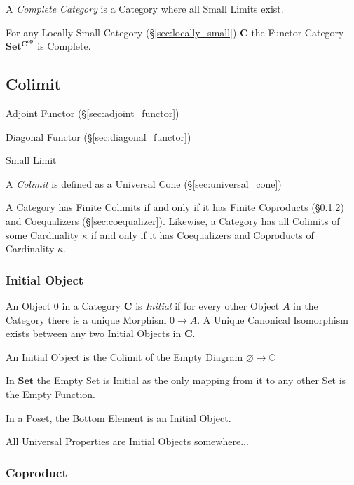 A \emph{Complete Category} is a Category where all Small Limits exist.

For any Locally Small Category (\S\ref{sec:locally_small})
$\mathbf{C}$ the Functor Category $\mathbf{Set^{C^{op}}}$ is Complete.



\subsection{Colimit} \label{sec:colimit}

Adjoint Functor (\S\ref{sec:adjoint_functor})

Diagonal Functor (\S\ref{sec:diagonal_functor})

Small Limit

A \emph{Colimit} is defined as a Universal Cone
(\S\ref{sec:universal_cone})

A Category has Finite Colimits if and only if it has Finite Coproducts
(\S\ref{sec:coproduct}) and Coequalizers (\S\ref{sec:coequalizer}).
Likewise, a Category has all Colimits of some Cardinality $\kappa$ if
and only if it has Coequalizers and Coproducts of Cardinality
$\kappa$.



\subsubsection{Initial Object}\label{sec:initial_object}

An Object $0$ in a Category $\mathbf{C}$ is \emph{Initial} if for
every other Object $A$ in the Category there is a unique Morphism $0
\rightarrow A$. A Unique Canonical Isomorphism exists between any two
Initial Objects in $\mathbf{C}$.

An Initial Object is the Colimit of the Empty Diagram $\varnothing
\rightarrow \mathbb{C}$

In $\mathbf{Set}$ the Empty Set is Initial as the only mapping from it
to any other Set is the Empty Function.

In a Poset, the Bottom Element is an Initial Object.

All Universal Properties are Initial Objects somewhere...



\subsubsection{Coproduct}\label{sec:coproduct}

